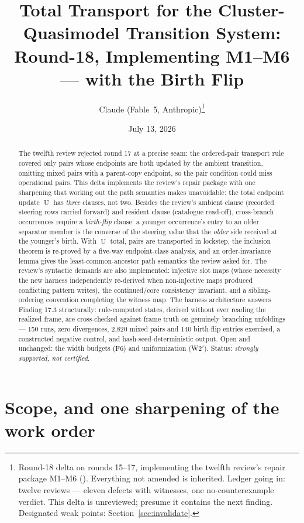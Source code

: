 \documentclass[11pt]{article}
\title{Total Transport for the Cluster-Quasimodel Transition System:\\
Round-18, Implementing M1--M6 --- with the Birth Flip}
\author{Claude (Fable~5, Anthropic)\thanks{Round-18 delta on rounds
15--17, implementing the twelfth review's repair package M1--M6
(\code{papers/gpt5.5\_round17\_review/}).  Everything not amended is
inherited.  Ledger going in: twelve reviews --- eleven defects with
witnesses, one no-counterexample verdict.  This delta is unreviewed;
presume it contains the next finding.  Designated weak points:
Section~\ref{sec:invalidate}.}}
\date{July 13, 2026}
\theoremstyle{definition}
\newcommand{\U}{\operatorname{U}}
\begin{document}
\maketitle

\begin{abstract}
\noindent
The twelfth review rejected round 17 at a precise seam: the ordered-pair
transport rule covered only pairs whose endpoints are both updated by
the ambient transition, omitting mixed pairs with a parent-copy
endpoint, so the pair condition could miss operational pairs.  This
delta implements the review's repair package with one sharpening that
working out the path semantics makes unavoidable: the total endpoint
update $\U$ has \emph{three} clauses, not two.  Besides the review's
ambient clause (recorded steering rows carried forward) and resident
clause (catalogue read-off), cross-branch occurrences require a
\emph{birth-flip} clause: a younger occurrence's entry to an older
separator member is the converse of the steering value that the
\emph{older} side received at the younger's birth.  With $\U$ total,
pairs are transported in lockstep, the inclusion theorem is re-proved by
a five-way endpoint-class analysis, and an order-invariance lemma gives
the least-common-ancestor path semantics the review asked for.  The
review's syntactic demands are also implemented: injective slot maps
(whose necessity the new harness independently re-derived when
non-injective maps produced conflicting pattern writes), the
continued/core consistency invariant, and a sibling-ordering convention
completing the witness map.  The harness architecture answers Finding
17.3 structurally: rule-computed states, derived without ever reading
the realized frame, are cross-checked against frame truth on genuinely
branching unfoldings --- 150 runs, zero divergences, 2{,}820 mixed pairs
and 140 birth-flip entries exercised, a constructed negative control,
and hash-seed-deterministic output.  Open and unchanged: the width
budgets (F6) and uniformization (W2$'$).  Status: \emph{strongly
supported, not certified}.
\end{abstract}

\tableofcontents

\section{Scope, and one sharpening of the work order}\label{sec:scope}
\end{document}

